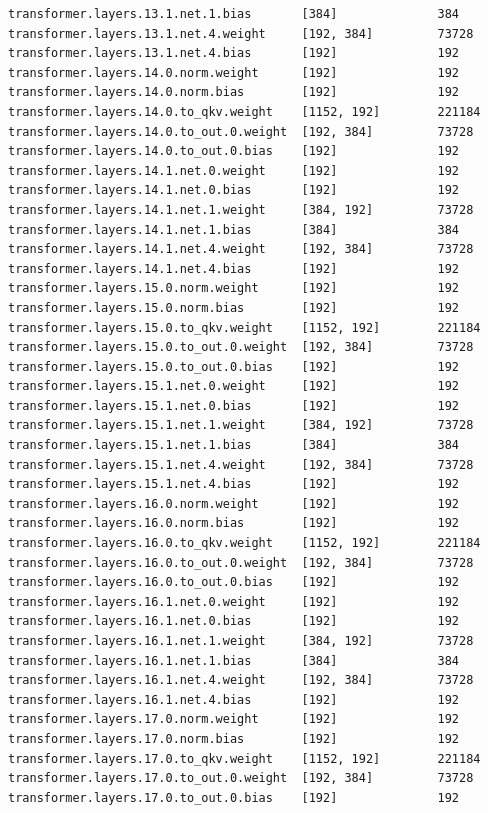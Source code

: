 \documentclass[notitlepage,cs4size,punct,oneside]{ctexrep}
\numberwithin{equation}{chapter}
\theoremstyle{mystyle}
\begin{document}
\begin{appendices}
{\begin{lstlisting}[style=output]
transformer.layers.13.1.net.1.bias       [384]              384
transformer.layers.13.1.net.4.weight     [192, 384]         73728
transformer.layers.13.1.net.4.bias       [192]              192
transformer.layers.14.0.norm.weight      [192]              192
transformer.layers.14.0.norm.bias        [192]              192
transformer.layers.14.0.to_qkv.weight    [1152, 192]        221184
transformer.layers.14.0.to_out.0.weight  [192, 384]         73728
transformer.layers.14.0.to_out.0.bias    [192]              192
transformer.layers.14.1.net.0.weight     [192]              192
transformer.layers.14.1.net.0.bias       [192]              192
transformer.layers.14.1.net.1.weight     [384, 192]         73728
transformer.layers.14.1.net.1.bias       [384]              384
transformer.layers.14.1.net.4.weight     [192, 384]         73728
transformer.layers.14.1.net.4.bias       [192]              192
transformer.layers.15.0.norm.weight      [192]              192
transformer.layers.15.0.norm.bias        [192]              192
transformer.layers.15.0.to_qkv.weight    [1152, 192]        221184
transformer.layers.15.0.to_out.0.weight  [192, 384]         73728
transformer.layers.15.0.to_out.0.bias    [192]              192
transformer.layers.15.1.net.0.weight     [192]              192
transformer.layers.15.1.net.0.bias       [192]              192
transformer.layers.15.1.net.1.weight     [384, 192]         73728
transformer.layers.15.1.net.1.bias       [384]              384
transformer.layers.15.1.net.4.weight     [192, 384]         73728
transformer.layers.15.1.net.4.bias       [192]              192
transformer.layers.16.0.norm.weight      [192]              192
transformer.layers.16.0.norm.bias        [192]              192
transformer.layers.16.0.to_qkv.weight    [1152, 192]        221184
transformer.layers.16.0.to_out.0.weight  [192, 384]         73728
transformer.layers.16.0.to_out.0.bias    [192]              192
transformer.layers.16.1.net.0.weight     [192]              192
transformer.layers.16.1.net.0.bias       [192]              192
transformer.layers.16.1.net.1.weight     [384, 192]         73728
transformer.layers.16.1.net.1.bias       [384]              384
transformer.layers.16.1.net.4.weight     [192, 384]         73728
transformer.layers.16.1.net.4.bias       [192]              192
transformer.layers.17.0.norm.weight      [192]              192
transformer.layers.17.0.norm.bias        [192]              192
transformer.layers.17.0.to_qkv.weight    [1152, 192]        221184
transformer.layers.17.0.to_out.0.weight  [192, 384]         73728
transformer.layers.17.0.to_out.0.bias    [192]              192

\end{lstlisting}}
\end{appendices}
\end{document}
